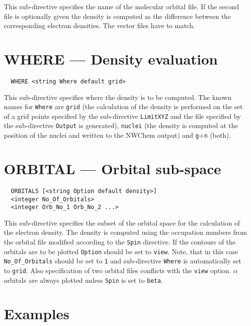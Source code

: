 This sub-directive specifies the name of the molecular orbital file.
If the second file is optionally given the density is computed as the
difference between the corresponding electron densities. The vector 
files have to match.



\section{WHERE --- Density evaluation}

\begin{verbatim}
  WHERE <string Where default grid>
\end{verbatim}

This sub-directive specifies where the density is to be computed.
The known names for \verb+Where+ are \verb+grid+ (the calculation of
the density is performed on the set of a grid points specified by the
sub-directive \verb+LimitXYZ+ and the file specified by the sub-directive
\verb+Output+ is generated), \verb+nuclei+ (the density is computed at
the position of the nuclei and written to the NWChem output) and
\verb+g++\verb+n+ (both).


\section{ORBITAL --- Orbital sub-space}

\begin{verbatim}
  ORBITALS [<string Option default density>]
  <integer No_Of_Orbitals>
  <integer Orb_No_1 Orb_No_2 ...>
\end{verbatim}

This sub-directive specifies the subset of the orbital space for the
calculation of the electron density. The density is computed using the
occupation numbers from the orbital file modified according to the
\verb+Spin+ directive. If the contours of the orbitals are to be plotted
\verb+Option+ should be set to \verb+view+. Note, that in this case
\verb+No_Of_Orbitals+ should be set to \verb+1+ and sub-directive
\verb+Where+ is automatically set to \verb+grid+. Also specification
of two orbital files conflicts with the \verb+view+ option.
$\alpha$ orbitals are always plotted unless \verb+Spin+ is set to
\verb+beta+.

\section{Examples}

